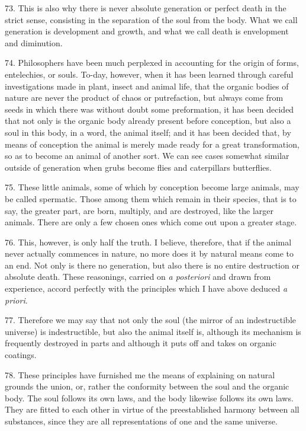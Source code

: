 73. This is also why there is never absolute generation or perfect
death in the strict sense, consisting in the separation of the soul
from the body. What we call generation is development and growth, and
what we call death is envelopment and diminution.

74. Philosophers have been much perplexed in accounting for the origin
of forms, entelechies, or souls. To-day, however, when it has been
learned through careful investigations made in plant, insect and
animal life, that the organic bodies of nature are never the product
of chaos or putrefaction, but always come from seeds in which there
was without doubt some preformation, it has been decided that not
only is the organic body already present before conception, but also a
soul in this body, in a word, the animal itself; and it has been
decided that, by means of conception the animal is merely made ready
for a great transformation, so as to become an animal of another sort.
We can see cases somewhat similar outside of generation when grubs
become flies and caterpillars butterflies.

75. These little animals, some of which by conception become large
animals, may be called spermatic. Those  among them which
remain in their species, that is to say, the greater part, are born,
multiply, and are destroyed, like the larger animals. There are only a
few chosen ones which come out upon a greater stage.

76. This, however, is only half the truth. I believe, therefore, that
if the animal never actually commences in nature, no more does it by
natural means come to an end. Not only is there no generation, but
also there is no entire destruction or absolute death. These
reasonings, carried on \textit{a posteriori} and drawn from
experience, accord perfectly with the principles which I have above
deduced \textit{a priori}.

77. Therefore we may say that not only the soul (the mirror of an
indestructible universe) is indestructible, but also the animal itself
is, although its mechanism is frequently destroyed in parts and
although it puts off and takes on organic coatings.

78. These principles have furnished me the means of explaining on
natural grounds the union, or, rather the conformity between the soul
and the organic body. The soul follows its own laws, and the body
likewise follows its own laws. They are fitted to each other in virtue
of the preestablished harmony between all substances, since they are
all representations of one and the same universe.

